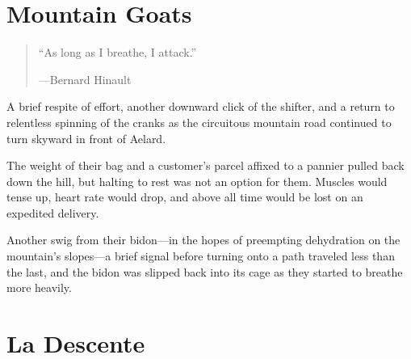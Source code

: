 \documentclass[11pt]{octavo}
\begin{document}
\tableofcontents
\chapter{Mountain Goats}
\begin{quote}
``As long as I breathe, I attack.''
\begin{flushright}
---Bernard Hinault
\end{flushright}
\end{quote}
A brief respite of effort, another downward click of the shifter, and a return 
to relentless spinning of the cranks as the circuitous mountain road continued 
to turn skyward in front of A\th{}elard.

The weight of their bag and a customer's parcel affixed to a pannier pulled 
back  down the hill, but halting to rest was not an option for them. Muscles 
would  tense up, heart rate would drop, and above all time would be lost on an 
expedited delivery.

Another swig from their bidon---in the hopes of preempting dehydration on the 
mountain's slopes---a brief signal before turning onto a path traveled less 
than the last, and the bidon was slipped back into its cage as they started to 
breathe more heavily.
\chapter{La Descente}
\end{document}
